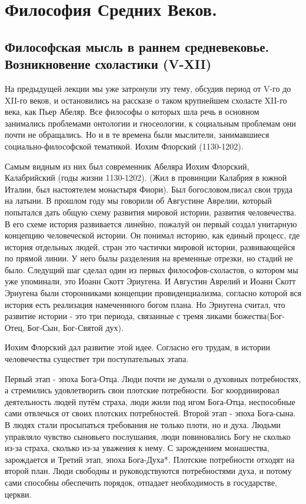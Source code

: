 \section{Философия Средних Веков.}


\subsection{Философская мысль в раннем средневековье. Возникновение схоластики (V-XII)}

На предыдущей лекции мы уже затронули эту тему, обсудив период от V-го до XII-го веков, и остановились на рассказе о таком крупнейшем схоласте XII-го века, как Пьер Абеляр. Все философы о которых шла речь в основном занимались проблемами онтологии и гносеологии, к социальным проблемам они почти не обращались. Но и в те времена были мыслители, занимавшиеся социально-философской тематикой.
Иохим Флорский (1130-1202).

Самым видным из них был современник Абеляра Иохим Флорский, Калабрийский (годы жизни 1130-1202). (Жил в провинции Калабрия в южной Италии, был настоятелем монастыря Фиори). Был богословом,писал свои труда на латыни. В прошлом году мы говорили об Августине Аврелии, который попытался дать общую схему развития мировой истории, развития человечества. В его схеме история развивается линейно, пожалуй он первый создал унитарную концепцию человеческой истории. Он понимал историю, как единый процесс, где история отдельных людей, стран это частички мировой истории, развивающейся по прямой линии. У него былы разделения на временные отрезки, но стадий не было. Следущий шаг сделал один из первых философов-схоластов, о котором мы уже упоминали, это Иоанн Скотт Эриугена. И Августин Аврелий и Иоанн Скотт Эриугена были сторонниками концепции провиденциализма, согласно которой вся история есть реализация намеченнного богом плана. Но Эриугена считал, что развитие истории - это три периода, связанные с тремя ликами божества(Бог-Отец, Бог-Сын, Бог-Святой дух).

Иохим Флорский дал развитие этой идее. Согласно его трудам, в истории человечества существет три поступательных этапа.

    Первый этап - эпоха Бога-Отца. Люди почти не думали о духовных потребностях, а стремились удовлетворить свои плотские потребности. Бог координировал деятельность людей путём страха, люди жили под игом Бога-Отца, неспособные сами отвлечься от своих плотских потребностей. Второй этап - эпоха Бога-сына. В людях стали просыпаться требования не только плоти, но и духа. Людьми управляло чувство сыновьего послушания, люди повиновались Богу не сколько из-за страха, сколько из-за уважения к нему. С зарождением монашества, зарождается и Третий этап, эпоха Бога-Духа*. Плотские потребности отходят на второй план. Люди свободны и руководствуются потребностями духа, и потому сами способны обеспечить порядок, отпадает необходимость в государстве, церкви.

